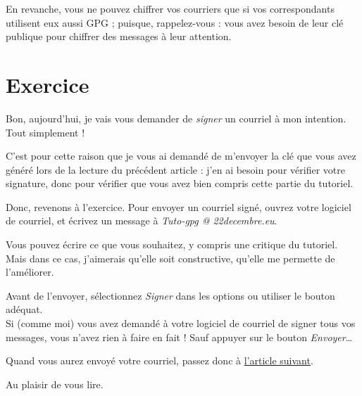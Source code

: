 En revanche, vous ne pouvez chiffrer vos courriers que si vos
correspondants utilisent eux aussi GPG ; puisque, rappelez-vous : vous
avez besoin de leur clé publique pour chiffrer des messages à leur
attention.

\section{Exercice}\label{exercice}

Bon, aujourd'hui, je vais vous demander de \emph{signer} un courriel à
mon intention. Tout simplement !

C'est pour cette raison que je vous ai demandé de m'envoyer la clé que
vous avez généré lors de la lecture du précédent article : j'en ai
besoin pour vérifier votre signature, donc pour vérifier que vous avez
bien compris cette partie du tutoriel.

Donc, revenons à l'exercice. Pour envoyer un courriel signé, ouvrez
votre logiciel de courriel, et écrivez un message à \emph{Tuto-gpg @
22decembre.eu}.

Vous pouvez écrire ce que vous souhaitez, y compris une critique du
tutoriel. Mais dans ce cas, j'aimerais qu'elle soit constructive,
qu'elle me permette de l'améliorer.

Avant de l'envoyer, sélectionnez \emph{Signer} dans les options ou
utiliser le bouton adéquat.\\Si (comme moi) vous avez demandé à votre
logiciel de courriel de signer tous vos messages, vous n'avez rien à
faire en fait ! Sauf appuyer sur le bouton \emph{Envoyer}\ldots{}

Quand vous aurez envoyé votre courriel, passez donc à
\href{\{filename\}6-crypted-mail-fr.md}{l'article suivant}.

Au plaisir de vous lire.
